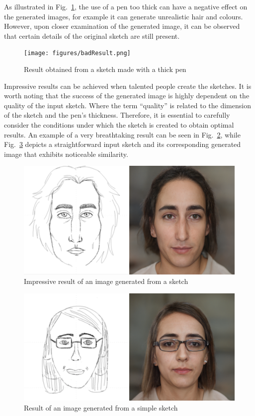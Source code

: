 \noindent As illustrated in Fig.~\ref{fig:result thick pen}, the use of a pen too thick can have a negative effect on the generated images, for example it can generate unrealistic hair and colours. However, upon closer examination of the generated image, it can be observed that certain details of the original sketch are still present. 
\begin{figure}[htbp]
  \centering
  \texttt{[image: figures/badResult.png]}
  \caption{Result obtained from a sketch made with a thick pen}
  \label{fig:result thick pen}
\end{figure}
%

\noindent Impressive results can be achieved when talented people create the sketches. It is worth noting that the success of the generated image is highly dependent on the quality of the input sketch. Where the term “quality” is related to the dimension of the sketch and the pen's thickness.
Therefore, it is essential to carefully consider the conditions under which the sketch is created to obtain optimal results. An example of a very breathtaking result can be seen in Fig.~\ref{fig:impressive result}, while Fig.~\ref{fig:result simple sketch} depicts a straightforward input sketch and its corresponding generated image that exhibits noticeable similarity.
\begin{figure}[htbp]
  \centering
  \includegraphics[scale=0.15]{figures/goodResult.png}
  \caption{Impressive result of an image generated from a sketch}
  \label{fig:impressive result}
\end{figure}
\begin{figure}[htbp]
  \centering
  \includegraphics[scale=0.25]{figures/goodResult-simpleSketch.png}
  \caption{Result of an image generated from a simple sketch}
  \label{fig:result simple sketch}
\end{figure}
%

